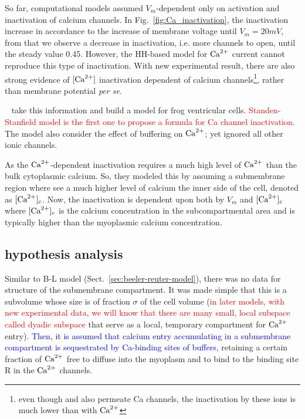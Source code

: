 So far, computational models assumed $V_m$-dependent only on activation and
inactivation of calcium channels.  In Fig.~\ref{fig:Ca_inactivation}, the
inactivation increase in accordance to the increase of membrane voltage until
$V_m=20mV$, from that we observe a decrease in inactivation, i.e. more channels
to open, until the steady value 0.45. However, the HH-based model for ${\text{Ca}^{2+}}$
current cannot reproduce this type of inactivation. With new experimental
result, there are also strong evidence of $[{\text{Ca}^{2+}}]$ inactivation dependent of
calcium channels\footnote{even though  and  also permeate Ca
  channels, the inactivation by these ions is much lower than with ${\text{Ca}^{2+}}$},
  rather than membrane potential {\it per se}. 
  
 ~\citep{standen1982bsm} take this information and build a model for frog
 ventricular cells. \textcolor{red}{Standen-Stanfield model is the first one to
 propose a formula for Ca channel inactivation}. The model also consider the
 effect of buffering on ${\text{Ca}^{2+}}$; yet ignored all other ionic channels.
 
As the ${\text{Ca}^{2+}}$-dependent inactivation requires a much high level of ${\text{Ca}^{2+}}$
  than the bulk cytoplasmic calcium. So, they modeled this by assuming a
  submembrane region where see a much higher level of calcium the inner side
  of the cell, denoted as $[{\text{Ca}^{2+}}]_c$.
  Now, the inactivation is dependent upon both by $V_m$ and $[{\text{Ca}^{2+}}]_c$ where
  $[{\text{Ca}^{2+}}]_c$ is the calcium concentration in the subcompartmental area and is
  typically higher than the myoplasmic calcium concentration.

\subsection{hypothesis analysis}
\label{sec:hypothesis-analysis-3}


Similar to B-L model (Sect.~\ref{sec:beeler-reuter-model}), there was
no data for structure of the submembrane compartment. It was made
simple that this is a subvolume whose size is of fraction $\sigma$ of
the cell volume
(\textcolor{red}{in later models, with new experimental data, we will
  know that there are many small, local subspace called dyadic
  subspace} that serve as a local, temporary compartment for ${\text{Ca}^{2+}}$
  entry).
\textcolor{blue}{Then, it is assumed that calcium entry
  accumulating in a submembrane compartment is sequestrated by
  Ca-binding sites of buffers},
retaining a certain fraction of ${\text{Ca}^{2+}}$ free to diffuse into the
myoplasm and to bind to the binding site R in the ${\text{Ca}^{2+}}$ channels.

